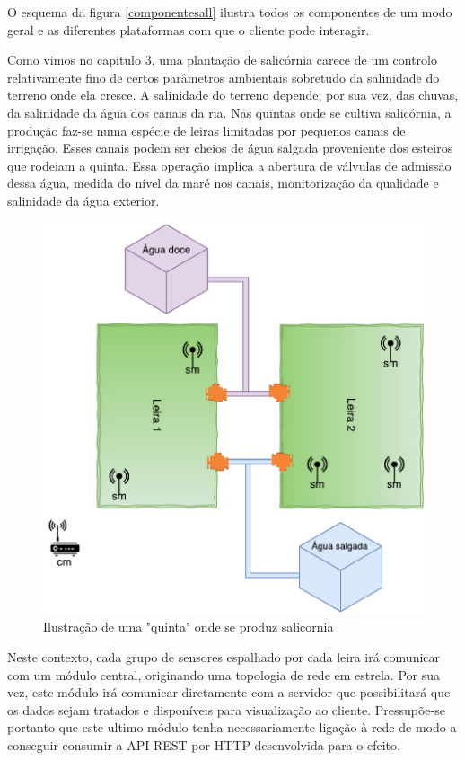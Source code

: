 O esquema da figura \ref{componentesall} ilustra todos os componentes de um modo geral e as diferentes plataformas com que o cliente pode interagir. 


Como vimos no capitulo 3, uma plantação de  salicórnia carece de um controlo relativamente fino de certos parâmetros ambientais sobretudo da salinidade do terreno onde ela cresce. A salinidade do terreno depende, por sua vez, das chuvas, da salinidade da água dos canais da ria. Nas quintas onde se cultiva salicórnia, a produção faz-se numa espécie de leiras limitadas por pequenos canais de irrigação. Esses canais podem ser cheios de água salgada proveniente dos esteiros que rodeiam a quinta. Essa operação implica a abertura de válvulas de admissão dessa água, medida do nível da maré nos canais, monitorização da qualidade e salinidade da água exterior.



\begin{figure}[!htb]
	\centering
	\includegraphics[scale=0.55]{esquemas/leiras-comm-geral.pdf}
	\caption{Ilustração de uma "quinta" onde se produz salicornia}
	\label{leira}
\end{figure}


 
 
Neste contexto, cada grupo de sensores espalhado por cada leira irá comunicar com um módulo central, originando uma topologia de rede em estrela.  Por sua vez, este módulo irá comunicar diretamente com a servidor que possibilitará que os dados sejam tratados e disponíveis para visualização ao cliente. Pressupõe-se portanto que este ultimo módulo tenha necessariamente ligação à rede de modo a conseguir consumir a API REST por HTTP desenvolvida para o efeito. 



